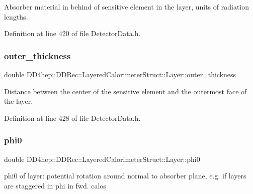 Absorber material in behind of sensitive element in the layer, units of radiation lengths. 



Definition at line 420 of file Detector\+Data.\+h.

\hypertarget{struct_d_d4hep_1_1_d_d_rec_1_1_layered_calorimeter_struct_1_1_layer_aad0fde2a5b642bc6dd0ff6a08a594da0}{}\label{struct_d_d4hep_1_1_d_d_rec_1_1_layered_calorimeter_struct_1_1_layer_aad0fde2a5b642bc6dd0ff6a08a594da0} 
\subsubsection{\texorpdfstring{outer\+\_\+thickness}{outer\_thickness}}
{\footnotesize\ttfamily double D\+D4hep\+::\+D\+D\+Rec\+::\+Layered\+Calorimeter\+Struct\+::\+Layer\+::outer\+\_\+thickness}



Distance between the center of the sensitive element and the outermost face of the layer. 



Definition at line 428 of file Detector\+Data.\+h.

\hypertarget{struct_d_d4hep_1_1_d_d_rec_1_1_layered_calorimeter_struct_1_1_layer_aab79660830a8d520db2439c5a817f709}{}\label{struct_d_d4hep_1_1_d_d_rec_1_1_layered_calorimeter_struct_1_1_layer_aab79660830a8d520db2439c5a817f709} 
\subsubsection{\texorpdfstring{phi0}{phi0}}
{\footnotesize\ttfamily double D\+D4hep\+::\+D\+D\+Rec\+::\+Layered\+Calorimeter\+Struct\+::\+Layer\+::phi0}



phi0 of layer\+: potential rotation around normal to absorber plane, e.\+g. if layers are \textquotesingle{}staggered\textquotesingle{} in phi in fwd. calos 



